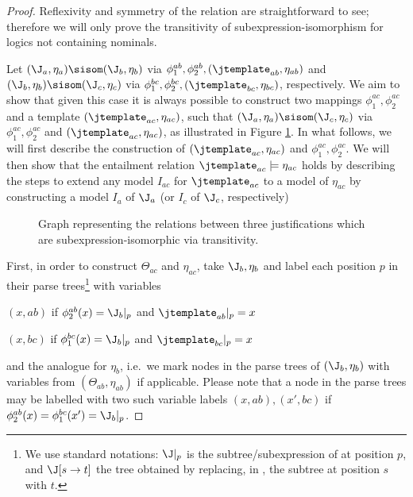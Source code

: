 \begin{proof} Reflexivity and symmetry of the relation are straightforward to see; therefore we will only prove the transitivity of subexpression-isomorphism for logics not containing nominals.

Let $(\J_{a}, \eta_{a}) \sisom (\J_{b}, \eta_{b}) $ via $\phi^{ab}_{1}, \phi^{ab}_{2}, (\jtemplate_{ab}, \eta_{ab})$ and $(\J_{b}, \eta_{b}) \sisom (\J_{c}, \eta_{c}) $ via $\phi^{bc}_{1}, \phi^{bc}_{2}, (\jtemplate_{bc}, \eta_{bc})$, respectively. We aim to show that given this case it is always possible to construct two mappings $\phi^{ac}_{1}, \phi^{ac}_{2}$ and a template  $(\jtemplate_{ac}, \eta_{ac})$, such that $(\J_{a}, \eta_{a}) \sisom (\J_{c}, \eta_{c}) $ via $\phi^{ac}_{1}, \phi^{ac}_{2}$ and $(\jtemplate_{ac}, \eta_{ac})$, as illustrated in Figure \ref{fig:transitivity}. In what follows, we will first describe the construction of  $(\jtemplate_{ac}, \eta_{ac})$ and $\phi^{ac}_{1}, \phi^{ac}_{2}$. We will then show that the entailment relation $\jtemplate_{ac} \models \eta_{ac}$ holds by describing the steps to extend any model $I_{ac}$ for $\jtemplate_{ac}$ to a model of $\eta_{ac}$ by constructing a model $I_{a}$ of $\J_{a}$ (or $I_{c}$ of $\J_{c}$, respectively)

\begin{figure}
\centering

\caption[Three justifications which are s-isomorphic via transitivity.]{Graph representing the relations between three justifications which are subexpression-isomorphic via transitivity.}\label{fig:transitivity}
\end{figure}

First, in order to construct $\Theta_{ac}$ and $\eta_{ac}$, take $\J_{b}, \eta_{b}$ and label each position $p$ in their parse trees\footnote{We use standard notations: $\J|_{p}$ is the subtree/subexpression of \J at position $p$, and $\J[s \rightarrow t]$ the tree obtained by replacing, in \J, the subtree at position $s$ with $t$.} with variables
\begin{compactitem}
\item $(x, ab)$ if $\phi^{ab}_{2}(x) = \J_{b}|_{p}$ and $\jtemplate_{ab}|_{p} = x$
\item $(x, bc)$ if $\phi^{bc}_{1}(x) = \J_{b}|_{p}$ and $\jtemplate_{bc}|_{p} = x$
\end{compactitem}
and the analogue for $\eta_{b}$, i.e.\ we mark nodes in the parse trees of $(\J_{b}, \eta_{b})$ with variables from $(\Theta_{ab}, \eta_{ab})$ if applicable. Please note that a node in the parse trees may be labelled with two such variable labels $(x, ab), (x', bc)$ if $\phi^{ab}_{2}(x) = \phi^{bc}_{1}(x') = \J_{b}|_{p}$.


\end{proof}
